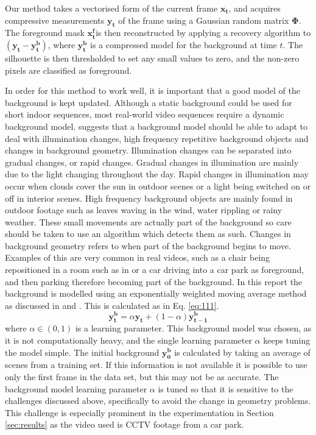 \documentclass[conference]{IEEEtran}
\begin{document}
Our method takes a vectorised form of the current frame $\boldsymbol{x_t}$, and acquires compressive measurements $\boldsymbol{y_t}$ of the frame using a Gaussian random matrix $\boldsymbol{\Phi}$. The foreground mask $\boldsymbol{x_t^f} $is then reconstructed by applying a recovery algorithm  to $(\boldsymbol{y_t} - \boldsymbol{y_t^b})$, where $\boldsymbol{y_t^b}$ is a compressed model for the background at time $t$. The silhouette is then thresholded to set any small values to zero, and the non-zero pixels are classified as foreground. 

In order for this method to work well, it is important that a good model of the background is kept updated. Although a static background could be used for short indoor sequences, most real-world video sequences require a dynamic background model. \cite{Piccardi2004a} suggests that a background model should be able to adapt to deal with illumination changes, high frequency repetitive background objects and changes in background geometry. Illumination changes can be separated into gradual changes, or rapid changes. Gradual changes in illumination are mainly due to the light changing throughout the day. Rapid changes in illumination may occur when clouds cover the sun in outdoor scenes or a light being switched on or off in interior scenes. High frequency background objects are mainly found in outdoor footage such as leaves waving in the wind, water rippling or rainy weather. These small movements are actually part of the background so care should be taken to use an algorithm which detects them as such.  Changes in background geometry refers to when part of the background begins to move. Examples of this are very common in real videos, such as a chair being repositioned in a room such as in \cite{toyama1999} or a car driving into a car park as foreground, and then parking therefore becoming part of the background. In this report the background is modelled using an exponentially weighted moving average method as discussed in \cite{Piccardi2004a} and \cite{Cossalter2009}. This is calculated as in Eq. \eqref{eq:111}.
\begin{equation}
  \label{eq:111}
  \boldsymbol{y_t^b} = \alpha \boldsymbol{y_t} + (1 - \alpha) \boldsymbol{y^b_{t-1}}
\end{equation}
 where $\alpha \in (0,1)$ is a learning parameter.
This background model was chosen, as it is not computationally heavy, and the single learning parameter $\alpha$ keeps tuning the model simple. The initial background $\boldsymbol{y^b_0}$ is calculated by taking an average of scenes from a training set. If this information is not available it is possible to use only the first frame in the data set, but this may not be as accurate. The background model learning parameter $\alpha$ is tuned so that it is sensitive to the challenges discussed above, specifically to avoid the change in geometry problems. This challenge is especially prominent in the experimentation in Section \ref{sec:results} as the video used is CCTV footage from a car park.   
\end{document}
